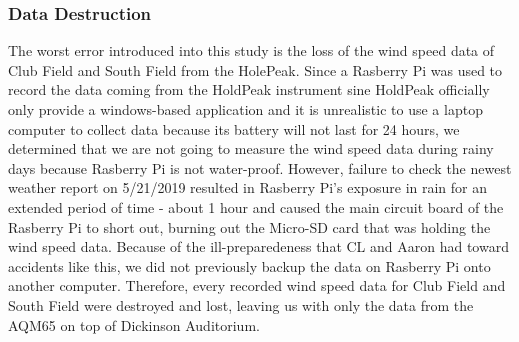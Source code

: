 \documentclass[review]{elsarticle}
\begin{document}
\subsubsection{Data Destruction}
\label{sec:analysis:erroranalysis:datadestruction}
The worst error introduced into this study is the loss of the wind speed data of Club Field and South Field from the HolePeak. Since a Rasberry Pi was used to record the data coming from the HoldPeak 
instrument sine HoldPeak officially only provide a windows-based application and it is unrealistic to use a laptop computer to collect data because its battery will not last for 24 hours, we determined 
that we are not going to measure the wind speed data during rainy days because Rasberry Pi is not water-proof. However, failure to check the newest weather report on 5/21/2019 resulted in Rasberry Pi's 
exposure in rain for an extended period of time - about 1 hour and caused the main circuit board of the Rasberry Pi to short out, burning out the Micro-SD card that was holding the wind speed data. Because 
of the ill-preparedeness that CL and Aaron had toward accidents like this, we did not previously backup the data on Rasberry Pi onto another computer. Therefore, every recorded wind speed data for Club Field 
and South Field were destroyed and lost, leaving us with only the data from the AQM65 on top of Dickinson Auditorium.


\clearpage
    
\end{document}
